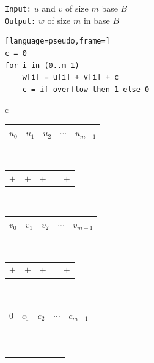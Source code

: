\begin{figure}
  \centering
  \begin{minipage}{0.45\textwidth}
    \small
    \texttt{Input:} $u$ and $v$ of size $m$ base $B$\\
    \texttt{Output:} $w$ of size $m$ in base $B$
\begin{lstlisting}[language=pseudo,frame=]
c = 0
for i in (0..m-1)
    w[i] = u[i] + v[i] + c
    c = if overflow then 1 else 0
\end{lstlisting}
  \end{minipage}
  \begin{minipage}{0.45\textwidth}
    \centering
    \footnotesize
    \begin{tabular}{c}
      \begin{tabular}{|C{0.7cm}|C{0.7cm}|C{0.7cm}|C{0.7cm}|C{0.7cm}|}
        \hline
        $u_0$ & $u_1$ & $u_2$ & $\cdots$ & $u_{m-1}$\\ 
        \hline
      \end{tabular}\\
      \begin{tabular}{C{0.7cm}C{0.7cm}C{0.7cm}C{0.7cm}C{0.7cm}}
        $+$ & $+$ & $+$ & & $+$\\ 
      \end{tabular}\\
      \begin{tabular}{|C{0.7cm}|C{0.7cm}|C{0.7cm}|C{0.7cm}|C{0.7cm}|}
        \hline
        $v_0$ & $v_1$ & $v_2$ & $\cdots$ & $v_{m-1}$\\
        \hline
      \end{tabular}\\
      \begin{tabular}{C{0.7cm}C{0.7cm}C{0.7cm}C{0.7cm}C{0.7cm}}
        $+$ & $+$ & $+$ &  & $+$\\
      \end{tabular}\\
      \begin{tabular}{C{0.7cm}C{0.7cm}C{0.7cm}C{0.7cm}C{0.7cm}}
        $0$ & $c_1$ &  $c_2$ & $\cdots$ &$c_{m-1}$ \\
      \end{tabular}\\[-0.8ex]
      \begin{tabular}{C{0.15cm}C{0.15cm}C{0.15cm}C{0.15cm}C{0.15cm}C{0.15cm}C{0.15cm}}
       \diagonalarrow{} & & \diagonalarrow{} &  & \diagonalarrow{} &  & \diagonalarrow{}\\
      \end{tabular}\\[-2ex]

\end{tabular}
\end{minipage}
\end{figure}

